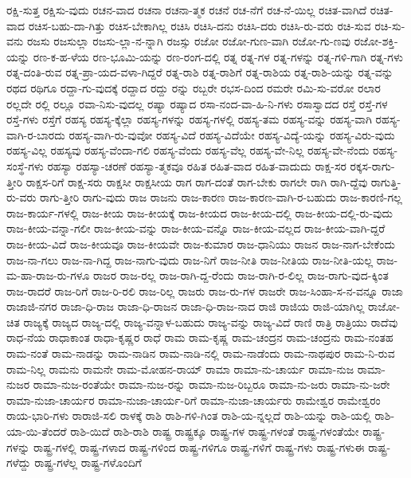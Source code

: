 {ರಕ್ಷಿ-ಸುತ್ತ
ರಕ್ಷಿಸು-ವುದು
ರಚನ-ವಾದ
ರಚನಾ
ರಚನಾ-ತ್ಮಕ
ರಚನೆ
ರಚ-ನೆಗೆ
ರಚ-ನೆ-ಯಿಲ್ಲ
ರಚಿತ-ವಾಗಿದೆ
ರಚಿತ-ವಾದ
ರಚಿಸ-ಬಹು-ದಾ-ಗಿತ್ತು
ರಚಿಸ-ಬೇಕಾಗಿಲ್ಲ
ರಚಿಸಿ
ರಚಿಸಿ-ದನು
ರಚಿಸಿ-ದರು
ರಚಿಸಿ-ರು-ವರು
ರಚಿ-ಸುವ
ರಚಿ-ಸು-ವನು
ರಜಸು
ರಜಸುಲ್ಲಾ
ರಜಸು-ಲ್ಲಾ-ನ-ನ್ನಾಗಿ
ರಜಸ್ಸು
ರಜೋ
ರಜೋ-ಗುಣ-ವಾಗಿ
ರಜೋ-ಗು-ಣವು
ರಜೋ-ಶಕ್ತಿ-ಯನ್ನು
ರಣ-ಕ-ಹ-ಳೆಯ
ರಣ-ಭೂಮಿ-ಯನ್ನು
ರಣ-ರಂಗ-ದಲ್ಲಿ
ರತ್ನ
ರತ್ನ-ಗಳ
ರತ್ನ-ಗಳನ್ನು
ರತ್ನ-ಗಳಿ-ಗಾಗಿ
ರತ್ನ-ಗಳು
ರತ್ನ-ದಂತಿ-ರುವ
ರತ್ನ-ಪ್ರಾ-ಯದ-ವಳಾ-ಗಿದ್ದರೆ
ರತ್ನ-ರಾಶಿ
ರತ್ನ-ರಾಶಿಗೆ
ರತ್ನ-ರಾಶಿಯ
ರತ್ನ-ರಾಶಿ-ಯನ್ನು
ರತ್ನ-ವನ್ನು
ರಥದ
ರಥಿಗೂ
ರದ್ದಾ-ಗು-ವುದಕ್ಕೆ
ರದ್ದಾದ
ರದ್ದು
ರನ್ನು
ರಬ್ಬರೇ
ರಭಸ-ದಿಂದ
ರಮರೇ
ರಮಿ-ಸು-ವರೋ
ರಲಾರ
ರಲ್ಲದೇ
ರಲ್ಲಿ
ರಲ್ಲೂ
ರವಾ-ನಿಸು-ವುದಲ್ಲ
ರಷ್ಯಾ
ರಷ್ಯಾದ
ರಸಾ-ನಂದ-ವಾ-ಹಿ-ನಿ-ಗಳು
ರಸಾಸ್ವಾದದ
ರಸ್ತೆ
ರಸ್ತೆ-ಗಳ
ರಸ್ತೆ-ಗಳು
ರಸ್ತೆಗೆ
ರಹಸ್ಯ
ರಹಸ್ಯ-ಕ್ಕೆಲ್ಲಾ
ರಹಸ್ಯ-ಗಳನ್ನು
ರಹಸ್ಯ-ಗಳಲ್ಲಿ
ರಹಸ್ಯ-ತಮ
ರಹಸ್ಯ-ವನ್ನು
ರಹಸ್ಯ-ವಾಗಿ
ರಹಸ್ಯ-ವಾಗಿ-ರ-ಬಾರದು
ರಹಸ್ಯ-ವಾಗಿ-ರು-ವುವೋ
ರಹಸ್ಯ-ವಿದೆ
ರಹಸ್ಯ-ವಿದೆಯೇ
ರಹಸ್ಯ-ವಿದ್ಯೆ-ಯನ್ನು
ರಹಸ್ಯ-ವಿರು-ವುದು
ರಹಸ್ಯ-ವಿಲ್ಲ
ರಹಸ್ಯವು
ರಹಸ್ಯ-ವೆಂದಾ-ಗಲಿ
ರಹಸ್ಯ-ವೆಂದು
ರಹಸ್ಯ-ವೆಲ್ಲ
ರಹಸ್ಯ-ವೇ-ನಿಲ್ಲ
ರಹಸ್ಯ-ವೇ-ನೆಂದು
ರಹಸ್ಯ-ಸಂಸ್ಥೆ-ಗಳು
ರಹಸ್ಯಾ
ರಹಸ್ಯಾ-ಚರಣೆ
ರಹಸ್ಯಾ-ತ್ಮಕವೂ
ರಹಿತ
ರಹಿತ-ವಾದ
ರಹಿತ-ವಾದುದು
ರಾಕ್ಷ-ಸರ
ರಕ್ಕಸ-ರಾಗು-ತ್ತೀರಿ
ರಾಕ್ಷಸ-ರಿಗೆ
ರಾಕ್ಷ-ಸರು
ರಾಕ್ಷಸೀ
ರಾಕ್ಷಸೀಯ
ರಾಗ
ರಾಗ-ದಂತೆ
ರಾಗ-ಬೇಕು
ರಾಗಲೇ
ರಾಗಿ
ರಾಗಿ-ದ್ದೆವು
ರಾಗುತ್ತಿ-ರು-ವರು
ರಾಗು-ತ್ತೀರಿ
ರಾಗು-ವುದು
ರಾಜ
ರಾಜನು
ರಾಜ-ಕಾರಣ
ರಾಜ-ಕಾರಣ-ವಾಗಿ-ರ-ಬಹುದು
ರಾಜ-ಕಾರಣಿ-ಗಲ್ಲ
ರಾಜ-ಕಾರ್ಯ-ಗಳಲ್ಲಿ
ರಾಜ-ಕೀಯ
ರಾಜ-ಕೀಯಕ್ಕೆ
ರಾಜ-ಕೀಯದ
ರಾಜ-ಕೀಯ-ದಲ್ಲಿ
ರಾಜ-ಕೀಯ-ದಲ್ಲಿ-ರು-ವುದು
ರಾಜ-ಕೀಯ-ವನ್ನಾ-ಗಲೀ
ರಾಜ-ಕೀಯ-ವನ್ನು
ರಾಜ-ಕೀಯ-ವನ್ನೊ
ರಾಜ-ಕೀಯ-ವಲ್ಲದ
ರಾಜ-ಕೀಯ-ವಾಗಿ-ದ್ದರೆ
ರಾಜ-ಕೀಯ-ವಿದೆ
ರಾಜ-ಕೀಯವೂ
ರಾಜ-ಕೀಯವೇ
ರಾಜ-ಕುಮಾರ
ರಾಜ-ಧಾನಿಯು
ರಾಜನ
ರಾಜ-ನಾಗ-ಬೇಕೆಂದು
ರಾಜ-ನಾ-ಗಲು
ರಾಜ-ನಾ-ಗಿದ್ದ
ರಾಜ-ನಾಗು-ವುದು
ರಾಜ-ನಿಗೆ
ರಾಜ-ನೀತಿ
ರಾಜ-ನೀತಿಯ
ರಾಜ-ನೀತಿ-ಯಲ್ಲ
ರಾಜ-ಮ-ಹಾ-ರಾಜ-ರು-ಗಳೂ
ರಾಜರ
ರಾಜ-ರಲ್ಲ
ರಾಜ-ರಾಗಿ-ದ್ದ-ರೆಂದು
ರಾಜ-ರಾಗಿ-ರ-ಲಿಲ್ಲ
ರಾಜ-ರಾಗು-ವುದ-ಕ್ಕಿಂತ
ರಾಜ-ರಾದರೆ
ರಾಜ-ರಿಗೆ
ರಾಜ-ರಿ-ರಲಿ
ರಾಜ-ರಿಲ್ಲ
ರಾಜರು
ರಾಜ-ರು-ಗಳ
ರಾಜರೇ
ರಾಜ-ಸಿಂಹಾ-ಸ-ನ-ವನ್ನೂ
ರಾಜಾ
ರಾಜಾಜಿ-ನಗರ
ರಾಜಾ-ಧಿ-ರಾಜ
ರಾಜಾ-ಧಿ-ರಾಜನ
ರಾಜಾ-ಧಿ-ರಾಜ-ನಾದ
ರಾಜಿ
ರಾಜಿಯ
ರಾಜಿ-ಯಾಗಿಲ್ಲ
ರಾಜೋ-ಚಿತ
ರಾಜ್ಯಕ್ಕೆ
ರಾಜ್ಯದ
ರಾಜ್ಯ-ದಲ್ಲಿ
ರಾಜ್ಯ-ವನ್ನಾಳ-ಬಹುದು
ರಾಜ್ಯ-ವನ್ನು
ರಾಜ್ಯ-ವಿದೆ
ರಾಣಿ
ರಾತ್ರಿ
ರಾತ್ರಿಯು
ರಾದೆವು
ರಾಧ-ನೆಯ
ರಾಧಾಕಾಂತ
ರಾಧಾ-ಕೃಷ್ಣರ
ರಾಧೆ
ರಾಮ
ರಾಮ-ಕೃಷ್ಣ
ರಾಮ-ಚಂದ್ರನ
ರಾಮ-ಚಂದ್ರನು
ರಾಮ-ನಂತಹ
ರಾಮ-ನಂತೆ
ರಾಮ-ನಾಡನ್ನು
ರಾಮ-ನಾಡಿನ
ರಾಮ-ನಾಡಿ-ನಲ್ಲಿ
ರಾಮ-ನಾಡೆಂದು
ರಾಮ-ನಾಥಪುರ
ರಾಮ-ನಿ-ರುವ
ರಾಮ-ನಿಲ್ಲ
ರಾಮನು
ರಾಮನೇ
ರಾಮ-ಮೋಹನ-ರಾಯ್
ರಾಮಾ
ರಾಮಾ-ನು-ಚಾರ್ಯ
ರಾಮಾ-ನುಜ
ರಾಮಾ-ನುಜರ
ರಾಮಾ-ನುಜ-ರಂತೆಯೇ
ರಾಮಾ-ನುಜ-ರನ್ನು
ರಾಮಾ-ನುಜ-ರಿಬ್ಬರೂ
ರಾಮಾ-ನು-ಜರು
ರಾಮಾ-ನು-ಜರೇ
ರಾಮಾ-ನುಜಾ-ಚಾರ್ಯರ
ರಾಮಾ-ನುಜಾ-ಚಾರ್ಯ-ರಿಗೆ
ರಾಮಾ-ನುಜಾ-ಚಾರ್ಯರು
ರಾಮೇಶ್ವರ
ರಾಮೇಶ್ವರಂ
ರಾಯ-ಭಾರಿ-ಗಳು
ರಾರಾಜಿ-ಸಲಿ
ರಾಳಕ್ಕೆ
ರಾಶಿ
ರಾಶಿ-ಗಳಿ-ಗಿಂತ
ರಾಶಿ-ಯ-ನ್ನಲ್ಲದೆ
ರಾಶಿ-ಯನ್ನು
ರಾಶಿ-ಯಲ್ಲಿ
ರಾಶಿ-ಯಾ-ಯಿ-ತೆಂದರೆ
ರಾಶಿ-ಯಿದೆ
ರಾಶಿ-ರಾಶಿ
ರಾಷ್ಟ್ರ
ರಾಷ್ಟ್ರಕ್ಕೂ
ರಾಷ್ಟ್ರ-ಗಳ
ರಾಷ್ಟ್ರ-ಗಳಂತೆ
ರಾಷ್ಟ್ರ-ಗಳಂತೆಯೇ
ರಾಷ್ಟ್ರ-ಗಳನ್ನು
ರಾಷ್ಟ್ರ-ಗಳಲ್ಲಿ
ರಾಷ್ಟ್ರ-ಗಳಾದ
ರಾಷ್ಟ್ರ-ಗಳಿಂದ
ರಾಷ್ಟ್ರ-ಗಳಿಗೂ
ರಾಷ್ಟ್ರ-ಗಳಿಗೆ
ರಾಷ್ಟ್ರ-ಗಳು
ರಾಷ್ಟ್ರ-ಗಳುಈ
ರಾಷ್ಟ್ರ-ಗಳೆದ್ದು
ರಾಷ್ಟ್ರ-ಗಳೆಲ್ಲ
ರಾಷ್ಟ್ರ-ಗಳೊಂದಿಗೆ
}
